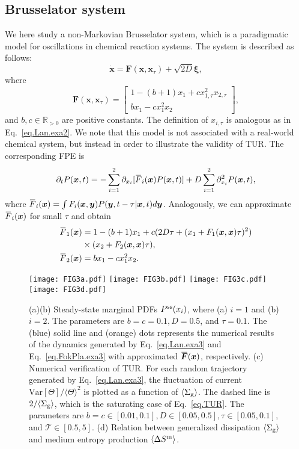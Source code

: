 \documentclass[pre,
twocolumn,
]{revtex4-1}
\newcommand{\overbar}[1]{\mkern 1.5mu\overline{\mkern-1.5mu#1\mkern-1.5mu}\mkern 1.5mu}
\theoremstyle{definition}
\theoremstyle{definition}
\newcommand{\bol}{\boldsymbol}
\newcommand{\mca}{\mathcal}
\newcommand{\mbb}{\mathbb}
\newcommand{\mrm}{\mathrm}
\newcommand{\eq}[1]{\begin{equation}#1\end{equation}}
\newcommand{\aln}[1]{\begin{aligned}#1\end{aligned}}
\newcommand{\avg}[1]{\langle #1\rangle}
\newcommand{\inl}[1]{$ #1 $}
\begin{document}
\subsection{Brusselator system}
We here study a non-Markovian Brusselator system, which is a paradigmatic model for oscillations in chemical reaction systems. The system is described as follows:
\eq{
\dot{\bol{x}}=\bol{F}(\bol{x},\bol{x}_\tau)+\sqrt{2D}\bol{\xi},\label{eq.Lan.exa3}
}
where
\eq{
\bol{F}(\bol{x},\bol{x}_\tau)=\begin{bmatrix}
1-(b+1)x_1+cx_{1,\tau}^2x_{2,\tau}\\
bx_1-cx_1^2x_2
\end{bmatrix}
,
}
and \inl{b,c\in\mbb{R}_{>0}} are positive constants.
The definition of \inl{x_{i,\tau}} is analogous as in Eq.~\eqref{eq.Lan.exa2}.
We note that this model is not associated with a real-world chemical system, but instead in order to illustrate the validity of TUR.
The corresponding FPE is
\eq{
\partial_tP(\bol{x},t)=-\sum_{i=1}^2\partial_{x_i}[\overbar{F}_i(\bol{x})P(\bol{x},t)]+D\sum_{i=1}^2\partial_{x_i}^2P(\bol{x},t),\label{eq.FokPla.exa3}
}
where \inl{\overbar{F}_i(\bol{x})=\int F_i(\bol{x},\bol{y})P(\bol{y},t-\tau|\bol{x},t)d\bol{y}}.
Analogously, we can approximate \inl{\overbar{F}_i(\bol{x})} for small \inl{\tau} and obtain
\eq{
\aln{
\overbar{F}_1(\bol{x})&=1-(b+1)x_1+c(2D\tau+(x_1+F_1(\bol{x},\bol{x})\tau)^2)\\
&\times(x_2+F_2(\bol{x},\bol{x})\tau),\\
\overbar{F}_2(\bol{x})&=bx_1-cx_1^2x_2.
}\label{eq.Fbar.exam3}
}
\begin{figure}[t]
	\centering
	\texttt{[image: FIG3a.pdf]}
	\texttt{[image: FIG3b.pdf]}
	\texttt{[image: FIG3c.pdf]}
	\texttt{[image: FIG3d.pdf]}
	\caption{(a)(b) Steady-state marginal PDFs \inl{P^{\rm ss}(x_i)}, where (a) \inl{i=1} and (b) \inl{i=2}. The parameters are \inl{b=c=0.1,D=0.5}, and \inl{\tau=0.1}. The (blue) solid line and (orange) dots represents the numerical results of the dynamics generated by Eq.~\eqref{eq.Lan.exa3} and Eq.~\eqref{eq.FokPla.exa3} with approximated \inl{\overbar{\bol{F}}(\bol{x})}, respectively. (c) Numerical verification of TUR. For each random trajectory generated by Eq.~\eqref{eq.Lan.exa3}, the fluctuation of current \inl{\mrm{Var}[\Theta]/\avg{\Theta}^2} is plotted as a function of \inl{\avg{\Sigma_{\rm g}}}. The dashed line is \inl{2/\avg{\Sigma_{\rm g}}}, which is the saturating case of Eq.~\eqref{eq.TUR}. The parameters are \inl{b=c\in[0.01,0.1],D\in[0.05,0.5],\tau\in[0.05,0.1]}, and \inl{\mca{T}\in[0.5,5]}. (d) Relation between generalized dissipation \inl{\avg{\Sigma_{\rm g}}} and medium entropy production \inl{\avg{\Delta S^{\rm m}}}.}\label{fig.exa3}
\end{figure}
\end{document}
